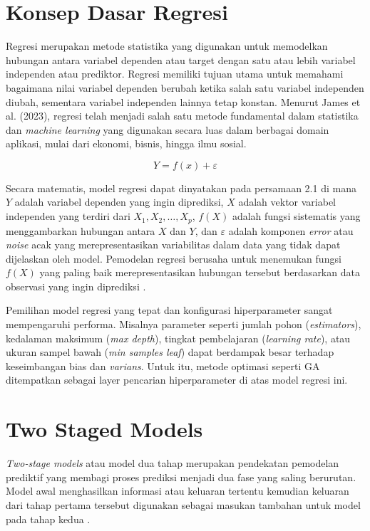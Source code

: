     \section {Konsep Dasar Regresi}
    Regresi merupakan metode statistika yang digunakan untuk memodelkan hubungan antara variabel dependen atau target dengan satu atau lebih variabel independen atau prediktor. Regresi memiliki tujuan utama untuk memahami bagaimana nilai variabel dependen berubah ketika salah satu variabel independen diubah, sementara variabel independen lainnya tetap konstan. Menurut James et al. (2023), regresi telah menjadi salah satu metode fundamental dalam statistika dan \textit{machine learning} yang digunakan secara luas dalam berbagai domain aplikasi, mulai dari ekonomi, bisnis, hingga ilmu sosial.
    
    \begin{equation} \label{eq:wmape}
        Y = f(x) + \varepsilon
    \end{equation}
     
   Secara matematis, model regresi dapat dinyatakan pada persamaan 2.1 di mana $Y$ adalah variabel dependen yang ingin diprediksi, $X$ adalah vektor variabel independen yang terdiri dari $X_1, X_2, \dots, X_p$, $f(X)$ adalah fungsi sistematis yang menggambarkan hubungan antara $X$ dan $Y$, dan $\varepsilon$ adalah komponen \textit{error} atau \textit{noise} acak yang merepresentasikan variabilitas dalam data yang tidak dapat dijelaskan oleh model. Pemodelan regresi berusaha untuk menemukan fungsi $f(X)$ yang paling baik merepresentasikan hubungan tersebut berdasarkan data observasi yang ingin diprediksi \cite{hastie2009elements}.
    
    Pemilihan model regresi yang tepat dan konfigurasi hiperparameter sangat mempengaruhi performa. Misalnya parameter seperti jumlah pohon (\textit{estimators}), kedalaman maksimum (\textit{max depth}), tingkat pembelajaran (\textit{learning rate}), atau ukuran sampel bawah (\textit{min samples leaf}) dapat berdampak besar terhadap keseimbangan bias dan \textit{varians}. Untuk itu, metode optimasi seperti GA ditempatkan sebagai layer pencarian hiperparameter di atas model regresi ini. 

    \section{Two Staged Models}
    \textit{Two-stage models} atau model dua tahap merupakan pendekatan pemodelan 
    prediktif yang membagi proses prediksi menjadi dua fase yang saling berurutan. Model awal menghasilkan informasi atau keluaran tertentu kemudian keluaran dari tahap 
    pertama tersebut digunakan sebagai masukan tambahan untuk model pada tahap 
    kedua \cite{en10101547}.
    
